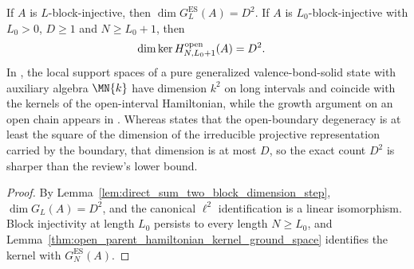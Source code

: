 \begin{lemma}
    \label{thm:open_parent_hamiltonian_kernel_finrank}
    \leanok
    If $A$ is $L$-block-injective, then $\dim G_{L}^{\mathrm{ES}}(A)=D^{2}$.
    If $A$ is $L_{0}$-block-injective with $L_{0}>0$, $D\geq1$ and
    $N\geq L_{0}+1$, then
    \begin{align}
        \dim\ker H^{\mathrm{open}}_{N,L_{0}+1}(A) & =D^{2}.
        \notag
    \end{align}
    In \cite[lines~1505--1510 and 1545--1558]{Nachtergaele1996Spectral}, the
    local support spaces of a pure generalized valence-bond-solid state with
    auxiliary algebra $\MN{k}$ have dimension $k^{2}$ on long intervals and
    coincide with the kernels of the open-interval Hamiltonian, while the
    growth argument on an open chain appears in
    \cite[lines~1211--1233]{PerezGarcia2007Matrix}. Whereas
    \cite[line~1174]{Cirac2021Matrix} states that the open-boundary degeneracy
    is at least the square of the dimension of the irreducible projective
    representation carried by the boundary, that dimension is at most $D$, so
    the exact count $D^{2}$ is sharper than the review's lower bound.
\end{lemma}

\begin{proof}
    \leanok
    By Lemma~\ref{lem:direct_sum_two_block_dimension_step},
    $\dim G_{L}(A)=D^{2}$, and the canonical $\ell^{2}$
    identification is a linear isomorphism. Block injectivity at length
    $L_{0}$ persists to every length $N\geq L_{0}$, and
    Lemma~\ref{thm:open_parent_hamiltonian_kernel_ground_space} identifies
    the kernel with $G_{N}^{\mathrm{ES}}(A)$.
\end{proof}

